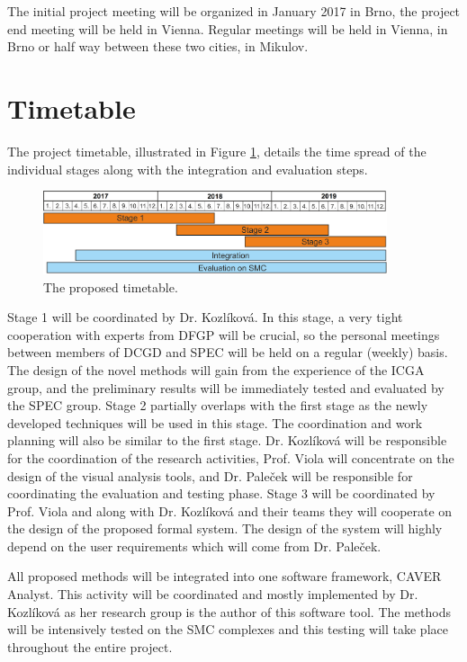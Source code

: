 \documentclass[11pt,a4paper,titlepage,oneside,onecolumn]{article}
\begin{document}
 
The initial project meeting will be organized in January 2017 in Brno, the project end meeting will be held in Vienna. 
Regular meetings will be held in Vienna, in Brno or half way between these two cities, in Mikulov.


\section{Timetable}
\label{sec:Timetable}

The project timetable, illustrated in Figure \ref{timetable}, details the time spread of the individual stages along with the integration and evaluation steps.
 
\begin{figure}[t]
\centering
\includegraphics[width=0.9\textwidth]{pics/timeline.png}
\caption{The proposed timetable.}
\label{timetable}
\end{figure}

Stage 1 will be coordinated by Dr. Kozl\'{i}kov\'{a}. 
In this stage, a very tight cooperation with experts from DFGP will be crucial, so the personal meetings between members of DCGD and SPEC will be held on a regular (weekly) basis. 
The design of the novel methods will gain from the experience of the ICGA group, and the preliminary results will be immediately tested and evaluated by the SPEC group. 
Stage 2 partially overlaps with the first stage as the newly developed techniques will be used in this stage.
The coordination and work planning will also be similar to the first stage. Dr. Kozl\'{i}kov\'{a} will be responsible for the coordination of the research activities, Prof. Viola will concentrate on the design of the visual analysis tools, and Dr. Pale\v{c}ek will be responsible for coordinating the evaluation and testing phase.
Stage 3 will be coordinated by Prof. Viola and along with Dr. Kozl\'{i}kov\'{a} and their teams they will cooperate on the design of the proposed formal system. 
The design of the system will highly depend on the user requirements which will come from Dr. Pale\v{c}ek.

All proposed methods will be integrated into one software framework, CAVER Analyst. This activity will be coordinated and mostly implemented by Dr. Kozl\'{i}kov\'{a} as her research group is the author of this software tool. The methods will be intensively tested on the SMC complexes and this testing will take place throughout the entire project.
\end{document}

